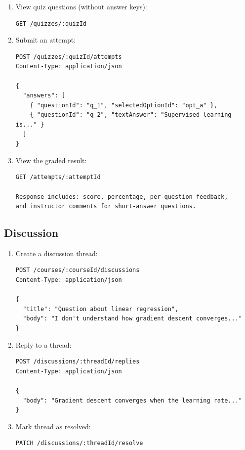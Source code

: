 \begin{enumerate}
  \item View quiz questions (without answer keys):

\begin{lstlisting}[caption=View quiz,label=lst:guide-view-quiz]
GET /quizzes/:quizId
\end{lstlisting}

  \item Submit an attempt:

\begin{lstlisting}[caption=Submit quiz attempt,label=lst:guide-submit-quiz]
POST /quizzes/:quizId/attempts
Content-Type: application/json

{
  "answers": [
    { "questionId": "q_1", "selectedOptionId": "opt_a" },
    { "questionId": "q_2", "textAnswer": "Supervised learning is..." }
  ]
}
\end{lstlisting}

  \item View the graded result:

\begin{lstlisting}[caption=View graded attempt,label=lst:guide-graded]
GET /attempts/:attemptId

Response includes: score, percentage, per-question feedback,
and instructor comments for short-answer questions.
\end{lstlisting}
\end{enumerate}

\subsection{Discussion}

\begin{enumerate}
  \item Create a discussion thread:

\begin{lstlisting}[caption=Create thread,label=lst:guide-create-thread]
POST /courses/:courseId/discussions
Content-Type: application/json

{
  "title": "Question about linear regression",
  "body": "I don't understand how gradient descent converges..."
}
\end{lstlisting}

  \item Reply to a thread:

\begin{lstlisting}[caption=Post reply,label=lst:guide-post-reply]
POST /discussions/:threadId/replies
Content-Type: application/json

{
  "body": "Gradient descent converges when the learning rate..."
}
\end{lstlisting}

  \item Mark thread as resolved:

\begin{lstlisting}[caption=Resolve thread,label=lst:guide-resolve-thread]
PATCH /discussions/:threadId/resolve
\end{lstlisting}
\end{enumerate}

